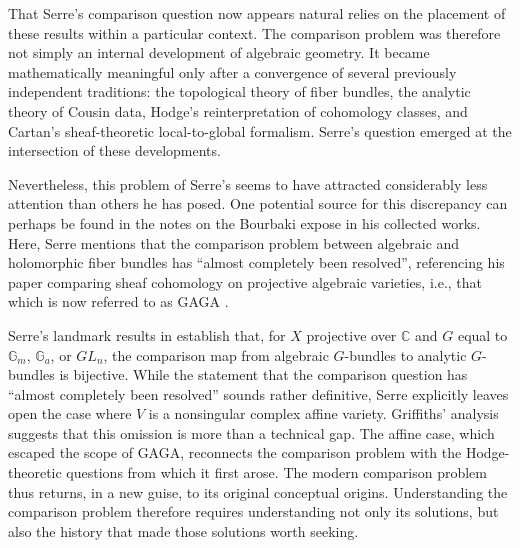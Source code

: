 \documentclass[11pt,leqno]{article}
\newcommand{\cplx}{{\mathbb C}}
\renewcommand{\1}{{\rm 1\hspace*{-0.4ex}%
\rule{0.1ex}{1.52ex}\hspace*{0.2ex}}}
\newcommand{\<}[1]{{\langle}#1 {\rangle}}
\theoremstyle{plain}
\theoremstyle{definition}
\theoremstyle{remark}
\numberwithin{equation}{subsection}
\begin{document}
That Serre's comparison question now appears natural relies on the placement of these results within a particular context.  The comparison problem was therefore not simply an internal development of algebraic geometry. It became mathematically meaningful only after a convergence of several previously independent traditions: the topological theory of fiber bundles, the analytic theory of Cousin data, Hodge's reinterpretation of cohomology classes, and Cartan's sheaf-theoretic local-to-global formalism. Serre's question emerged at the intersection of these developments.

Nevertheless, this problem of Serre's seems to have attracted considerably less attention than others he has posed.  One potential source for this discrepancy can perhaps be found in the notes on the Bourbaki expose in his collected works.  Here, Serre mentions \cite{Serre1986OeuvresI} that the comparison problem between algebraic and holomorphic fiber bundles has ``almost completely been resolved'', referencing his paper comparing sheaf cohomology on projective algebraic varieties, i.e., that which is now referred to as GAGA \cite{SerreGAGA}.  

Serre's landmark results in \cite{SerreGAGA} establish that, for $X$ projective over $\cplx$ and $G$ equal to $\mathbb{G}_m$, $\mathbb{G}_a$, or $GL_n$, the comparison map from algebraic $G$-bundles to analytic $G$-bundles is bijective.  While the statement that the comparison question has ``almost completely been resolved'' sounds rather definitive, Serre explicitly leaves open the case where \(V\) is a nonsingular complex affine variety. Griffiths' analysis \cite{Griffiths1972FunctionTheoryIA,Griffiths1972FunctionTheoryIB} suggests that this omission is more than a technical gap. The affine case, which escaped the scope of GAGA, reconnects the comparison problem with the Hodge-theoretic questions from which it first arose. The modern comparison problem thus returns, in a new guise, to its original conceptual origins. Understanding the comparison problem therefore requires understanding not only its solutions, but also the history that made those solutions worth seeking.



  

\end{document}
